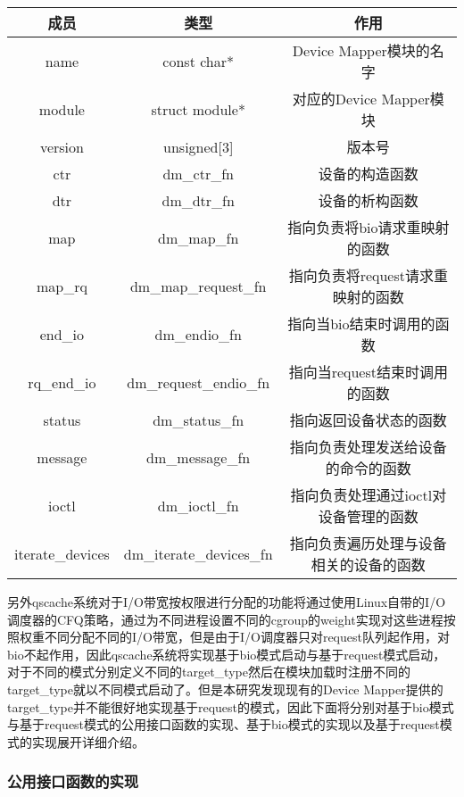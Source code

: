 \begin{table}[H]
    \centering
    \begin{tabular}{ccc} 
        \toprule
        成员 & 类型 & 作用\\
        \midrule
        name & const char* & Device Mapper模块的名字 \\ 
        module & struct module* & 对应的Device Mapper模块 \\ 
        version & unsigned[3] & 版本号 \\ 
        ctr & dm\_ctr\_fn & 设备的构造函数 \\ 
        dtr & dm\_dtr\_fn & 设备的析构函数 \\ 
        map & dm\_map\_fn & 指向负责将bio请求重映射的函数 \\ 
        map\_rq & dm\_map\_request\_fn & 指向负责将request请求重映射的函数 \\ 
        end\_io & dm\_endio\_fn & 指向当bio结束时调用的函数 \\ 
        rq\_end\_io & dm\_request\_endio\_fn & 指向当request结束时调用的函数 \\ 
        status & dm\_status\_fn & 指向返回设备状态的函数 \\ 
        message & dm\_message\_fn & 指向负责处理发送给设备的命令的函数 \\ 
        ioctl & dm\_ioctl\_fn & 指向负责处理通过ioctl对设备管理的函数 \\ 
        iterate\_devices & dm\_iterate\_devices\_fn & 指向负责遍历处理与设备相关的设备的函数 \\ 
        \bottomrule
    \end{tabular}
\end{table}

另外qscache系统对于I/O带宽按权限进行分配的功能将通过使用Linux自带的I/O调度器的CFQ策略，通过为不同进程设置不同的cgroup的weight实现对这些进程按照权重不同分配不同的I/O带宽，但是由于I/O调度器只对request队列起作用，对bio不起作用，因此qscache系统将实现基于bio模式启动与基于request模式启动，对于不同的模式分别定义不同的target\_type然后在模块加载时注册不同的target\_type就以不同模式启动了。但是本研究发现现有的Device Mapper提供的target\_type并不能很好地实现基于request的模式，因此下面将分别对基于bio模式与基于request模式的公用接口函数的实现、基于bio模式的实现以及基于request模式的实现展开详细介绍。

\subsubsection{公用接口函数的实现}

